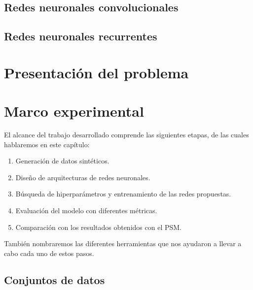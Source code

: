 \documentclass[a4paper,12pt,spanish]{book}
\begin{document}
\section{Redes neuronales convolucionales}


\section{Redes neuronales recurrentes}


% 

\chapter{Presentación del problema} \label{chap:problema}


\chapter{Marco experimental}
El alcance del trabajo desarrollado comprende las siguientes etapas, de las cuales
hablaremos en este capítulo:
\begin{enumerate}[itemsep=0.1cm, label=\textbf{\arabic*.}]
    \item Generación de datos sintéticos.
    \item Diseño de arquitecturas de redes neuronales.
    \item Búsqueda de hiperparámetros y entrenamiento de las redes propuestas.
    \item Evaluación del modelo con diferentes métricas.
    \item Comparación con los resultados obtenidos con el PSM.
\end{enumerate}

También nombraremos las diferentes herramientas que nos ayudaron a llevar a cabo
cada uno de estos pasos.

\section{Conjuntos de datos} \label{sec:datos}

\end{document}
